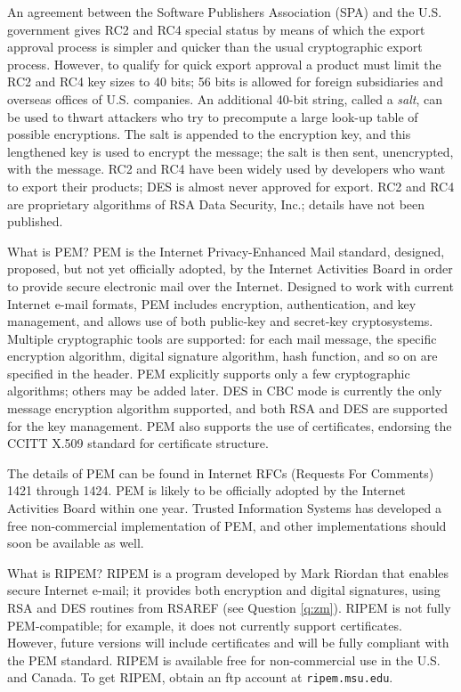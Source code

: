 An agreement between the Software Publishers Association (SPA) and the U.S. 
government gives RC2 and RC4 special status by means of which the export 
approval process is simpler and quicker than the usual cryptographic export 
process. However, to qualify for quick export approval a product must limit 
the RC2 and RC4 key sizes to 40 bits; 56 bits is allowed for foreign 
subsidiaries and overseas offices of U.S. companies. An additional 40-bit 
string, called a {\em salt}, can be used to thwart attackers who try to 
precompute a large look-up table of possible encryptions. The salt is 
appended to the encryption key, and this lengthened key is used to encrypt 
the message; the salt is then sent, unencrypted, with the message. RC2 and 
RC4 have been widely used by developers who want to export their products; 
DES is almost never approved for export. RC2 and RC4 are proprietary 
algorithms of RSA Data Security, Inc.; details have not been published.

{What is PEM?}
PEM is the Internet Privacy-Enhanced Mail standard, designed, proposed, but 
not yet officially adopted, by the Internet Activities Board in order to 
provide secure electronic mail over the Internet. Designed to work with 
current Internet e-mail formats, PEM includes encryption, authentication, 
and key management, and allows use of both public-key and secret-key 
cryptosystems. Multiple cryptographic tools are supported: for each mail 
message, the specific encryption algorithm, digital signature algorithm, 
hash function, and so on are specified in the header. PEM explicitly 
supports only a few cryptographic algorithms; others may be added later. 
DES in CBC mode is currently the only message encryption algorithm supported, 
and both RSA and DES are supported for the key management. PEM also supports 
the use of certificates, endorsing the CCITT X.509 standard for certificate 
structure. 

The details of PEM can be found in Internet RFCs (Requests For Comments) 
1421 through 1424. PEM is likely to be officially adopted by the Internet 
Activities Board within one year. Trusted Information Systems has developed
a free non-commercial implementation of PEM, and other implementations should 
soon be available as well.

{What is RIPEM?}
RIPEM is a program developed by Mark Riordan that enables secure Internet 
e-mail; it provides both encryption and digital signatures, using RSA and 
DES routines from RSAREF (see Question \ref{q:zm}). RIPEM is not fully 
PEM-compatible; for example, it does not currently support certificates. 
However, future versions will include certificates and will be fully 
compliant with the PEM standard. RIPEM is available free for non-commercial 
use in the U.S. and Canada. To get RIPEM, obtain an ftp account at 
\verb+ripem.msu.edu+.

